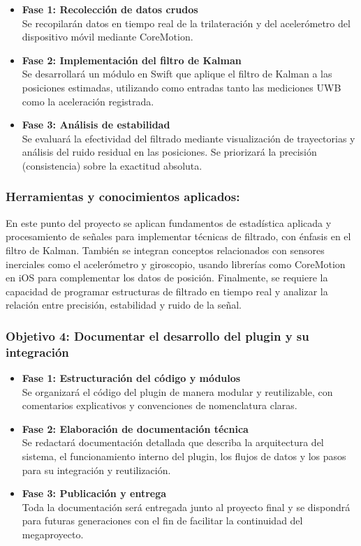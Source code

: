 \documentclass{article}
\begin{document}
\begin{itemize}
    \item \textbf{Fase 1: Recolección de datos crudos} \\
    Se recopilarán datos en tiempo real de la trilateración y del acelerómetro del dispositivo móvil mediante CoreMotion.

    \item \textbf{Fase 2: Implementación del filtro de Kalman} \\
    Se desarrollará un módulo en Swift que aplique el filtro de Kalman a las posiciones estimadas, utilizando como entradas tanto las mediciones UWB como la aceleración registrada.

    \item \textbf{Fase 3: Análisis de estabilidad} \\
    Se evaluará la efectividad del filtrado mediante visualización de trayectorias y análisis del ruido residual en las posiciones. Se priorizará la precisión (consistencia) sobre la exactitud absoluta.
\end{itemize}

\subsubsection{Herramientas y conocimientos aplicados:} 
{\justify En este punto del proyecto se aplican fundamentos de estadística aplicada y procesamiento de señales para implementar técnicas de filtrado, con énfasis en el filtro de Kalman. También se integran conceptos relacionados con sensores inerciales como el acelerómetro y giroscopio, usando librerías como CoreMotion en iOS para complementar los datos de posición. Finalmente, se requiere la capacidad de programar estructuras de filtrado en tiempo real y analizar la relación entre precisión, estabilidad y ruido de la señal.}

\subsubsection{Objetivo 4: Documentar el desarrollo del plugin y su integración}

\begin{itemize}
    \item \textbf{Fase 1: Estructuración del código y módulos} \\
    Se organizará el código del plugin de manera modular y reutilizable, con comentarios explicativos y convenciones de nomenclatura claras.

    \item \textbf{Fase 2: Elaboración de documentación técnica} \\
    Se redactará documentación detallada que describa la arquitectura del sistema, el funcionamiento interno del plugin, los flujos de datos y los pasos para su integración y reutilización.

    \item \textbf{Fase 3: Publicación y entrega} \\
    Toda la documentación será entregada junto al proyecto final y se dispondrá para futuras generaciones con el fin de facilitar la continuidad del megaproyecto.
\end{itemize}
\end{document}
